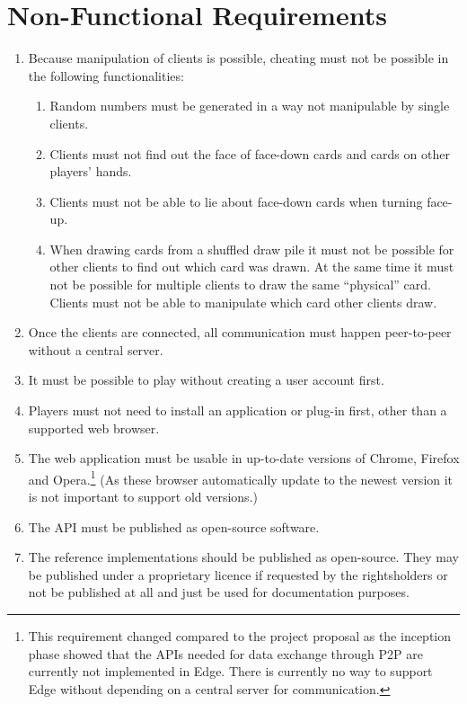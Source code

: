 \section{Non-Functional Requirements}

\begin{enumerate}
  \item Because manipulation of clients is possible, cheating must not be
  possible in the following functionalities:
  \begin{enumerate}
    \item Random numbers must be generated in a way not manipulable by single
    clients.
    \item Clients must not find out the \gls{face} of \gls{face}-down cards and
    cards on other players' \glspl{hand}.
    \item Clients must not be able to lie about \gls{face}-down cards when
    turning \gls{face}-up.
    \item When drawing cards from a shuffled \gls{draw pile} it must not be
    possible for other clients to find out which card was drawn. At the same
    time it must not be possible for multiple clients to draw the same
    ``physical'' card. Clients must not be able to manipulate which card other
    clients draw.
  \end{enumerate}
  \item Once the clients are connected, all communication must happen
  \gls{peer-to-peer} without a central server.
  \item It must be possible to play without creating a user account first.
  \item Players must not need to install an application or plug-in first, other
  than a supported web browser.
  \item The web application must be usable in up-to-date versions of Chrome,
  Firefox and Opera.\footnote{This requirement changed compared to the project
  proposal as the inception phase showed that the APIs needed for data exchange
  through \gls{P2P} are currently not implemented in Edge. There is currently
  no way to support Edge without depending on a central server for
  communication.} (As these browser automatically update to the newest version
  it is not important to support old versions.)
  \item The API must be published as open-source software.
  \item The reference implementations should be published as open-source. They
  may be published under a proprietary licence if requested by the rightsholders
  or not be published at all and just be used for documentation purposes.
\end{enumerate}

